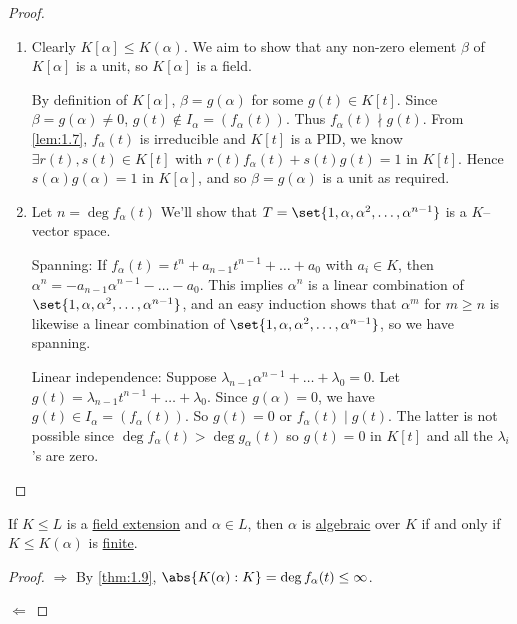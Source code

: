 \documentclass{article}
\begin{document}
\begin{proof}
    \leavevmode
    \begin{enumerate}[label=(\roman*)]
        \item Clearly $K[\alpha] \leq K(\alpha)$. We aim to show that any non-zero element $\beta$ of $K[\alpha]$ is a unit, so $K[\alpha]$ is a field.

            By definition of $K[\alpha]$, $\beta = g(\alpha)$ for some $g(t) \in K[t]$.  Since $\beta = g(\alpha) \neq 0$, $g(t) \notin I_\alpha = (f_\alpha(t))$.  Thus $f_\alpha(t) \nmid g(t)$.
            From \cref{lem:1.7}, $f_\alpha(t)$ is irreducible and $K[t]$ is a PID, we know $\exists r(t), s(t) \in K[t]$ with $r(t) f_\alpha(t) + s(t) g(t) = 1$ in $K[t]$.
            Hence $s(\alpha) g(\alpha) = 1$ in $K[\alpha]$, and so $\beta = g(\alpha)$ is a unit as required.
        \item Let $n = \deg f_\alpha(t)$ We'll show that $T = \set{1, \alpha, \alpha^2, \dotsc, \alpha^{n-1}}$ is a $K$--vector space.

            Spanning: If $f_\alpha(t) = t^n + a_{n-1} t^{n-1} + \dots + a_0$ with $a_i \in K$, then $\alpha^n = -a_{n-1} \alpha^{n-1} - \dots - a_0$.
            This implies $\alpha^n$ is a linear combination of $\set{1, \alpha, \alpha^2, \dotsc, \alpha^{n-1}}$, and an easy induction shows that $\alpha^m$ for $m \geq n$ is likewise a linear combination of $\set{1, \alpha, \alpha^2, \dotsc, \alpha^{n-1}}$, so we have spanning.

            Linear independence: Suppose $\lambda_{n-1} \alpha^{n-1} + \dotsc + \lambda_0 = 0$.
            Let $g(t) = \lambda_{n-1} t^{n-1} + \dotsc + \lambda_0$.  Since $g(\alpha) = 0$, we have $g(t) \in I_\alpha = (f_\alpha(t)).$  So $g(t) = 0$ or $f_\alpha(t) \mid g(t)$.
            The latter is not possible since $\deg f_\alpha(t) > \deg g_\alpha(t)$ so $g(t) = 0$ in $K[t]$ and all the $\lambda_i$'s are zero.
    \end{enumerate}
\end{proof}

\begin{ncor}
    If $K \leq L$ is a \hyperlink{def:fieldExt}{field extension} and $\alpha \in L$, then $\alpha$ is \hyperlink{def:algebraic}{algebraic} over $K$ if and only if $K \leq K(\alpha)$ is \hyperlink{def:degreeOfFieldExt}{finite}.
\end{ncor}

\begin{proof}
    $\Rightarrow$ By \cref{thm:1.9}, $\abs{K(\alpha):K} = \deg f_\alpha(t) \leq \infty$.

    $\Leftarrow$ 
\end{proof}
\end{document}
